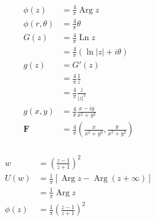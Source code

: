 \documentclass{article}
\newcommand{\Arg}{\operatorname{Arg}}
\newcommand{\Ln}{\operatorname{Ln}}
\renewcommand{\vec}[1]{\boldsymbol{\mathbf{#1}}}
\begin{document}
\begin{align*}
  \phi(z)         & = \frac{4}{\pi} \Arg z                                                  \\
  \phi(r, \theta) & = \frac{4}{\pi} \theta                                                  \\
  G(z)            & = \frac{4}{\pi} \Ln z                                                   \\
                  & = \frac{4}{\pi} (\ln |z| + i \theta)                                    \\
  g(z)            & = G'(z)                                                                 \\
                  & = \frac{4}{\pi} \frac{1}{z}                                             \\
                  & = \frac{4}{\pi} \frac{\overline{z}}{|z|^2}                              \\
  g(x, y)         & = \frac{4}{\pi} \frac{x - i y}{x^2 + y^2}                               \\
  \vec{F}         & = \frac{4}{\pi} \left( \frac{x}{x^2 + y^2}, \frac{y}{x^2 + y^2} \right)
\end{align*}

\setcounter{subsubsection}{6}
\subsubsection{}

\begin{align*}
  w       & = \left( \frac{z - 1}{z + 1} \right)^2               \\
  U(w)    & = \frac{1}{\pi} [\Arg z - \Arg (z + \infty)]         \\
          & = \frac{1}{\pi} \Arg z                               \\
  \phi(z) & = \frac{1}{\pi} \left( \frac{z - 1}{z + 1} \right)^2
\end{align*}

\setcounter{subsubsection}{8}
\subsubsection{}
\end{document}
